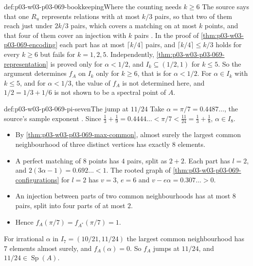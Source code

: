 \begin{hbwarning}{def:p03-w03-p03-069-bookkeeping}{Where the counting needs \(k\geq6\)}
The source says that one \(R_u\) represents relations with at most \(k/3\)
pairs, so that two of them reach just under \(2k/3\) pairs, which covers a
matching on at most \(k\) points, and that four of them cover an injection
with \(k\) pairs \cite[pp.~17--18]{Spencer2007LogicRandomStructuresAuthor}.
In the proof of \cref{thm:p03-w03-p03-069-encoding} each part has at most
\(\lceil k/4\rceil\) pairs, and \(\lceil k/4\rceil\leq k/3\) holds for every
\(k\geq6\) but fails for \(k=1,2,5\).  Independently,
\cref{thm:p03-w03-p03-069-representation} is proved only for
\(\alpha<1/2\), and \(I_k\subseteq(1/2,1)\) for \(k\leq5\).  So the
argument determines \(f_A\) on \(I_k\) only for \(k\geq6\), that is for
\(\alpha<1/2\).  For \(\alpha\in I_k\) with \(k\leq5\), and for
\(\alpha<1/3\), the value of \(f_A\) is not determined here, and
\(1/2=1/3+1/6\) is not shown to be a spectral point of \(A\).
\end{hbwarning}

\begin{hbexample}{def:p03-w03-p03-069-pi-seven}{The jump at \(11/24\)}
Take \(\alpha=\pi/7=0.4487\ldots\), the source's sample exponent
\cite[p.~7]{Spencer2007LogicRandomStructuresAuthor}.  Since
\(\tfrac13+\tfrac19=0.4444\ldots<\pi/7<\tfrac{11}{24}=\tfrac13+\tfrac18\),
\(\alpha\in I_8\).
\begin{itemize}
\item By \cref{thm:p03-w03-p03-069-max-common}, almost surely the largest
common neighbourhood of three distinct vertices has exactly \(8\) elements.
\item A perfect matching of \(8\) points has \(4\) pairs, split as \(2+2\).
Each part has \(l=2\), and \(2(3\alpha-1)=0.692\ldots<1\).  The rooted graph
of \cref{thm:p03-w03-p03-069-configurations} for \(l=2\) has \(v=3\),
\(e=6\) and \(v-e\alpha=0.307\ldots>0\).
\item An injection between parts of two common neighbourhoods has at most
\(8\) pairs, split into four parts of at most \(2\).
\item Hence \(f_A(\pi/7)=f_{A^*}(\pi/7)=1\).
\end{itemize}
For irrational \(\alpha\) in \(I_7=(10/21,11/24)\) the largest common
neighbourhood has \(7\) elements almost surely, and \(f_A(\alpha)=0\).  So
\(f_A\) jumps at \(11/24\), and \(11/24\in\operatorname{Sp}(A)\).
\end{hbexample}

